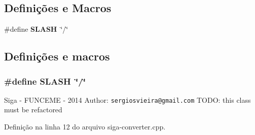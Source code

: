 \subsection*{Definições e Macros}
\begin{DoxyCompactItemize}
\item 
\#define {\bf S\+L\+A\+SH}~\char`\"{}/\char`\"{}
\end{DoxyCompactItemize}


\subsection{Definições e macros}
\subsubsection[{S\+L\+A\+SH}]{\setlength{\rightskip}{0pt plus 5cm}\#define S\+L\+A\+SH~\char`\"{}/\char`\"{}}\label{siga-converter_8cpp_a69eb17477fd6f6af2c9ca2d5f4c7df3c}
Siga -\/ F\+U\+N\+C\+E\+ME -\/ 2014 Author\+: {\tt sergiosvieira@gmail.\+com} T\+O\+DO\+: this class must be refactored 

Definição na linha 12 do arquivo siga-\/converter.\+cpp.

